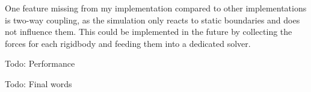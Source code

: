 \documentclass[intern]{cgMA}
\begin{document}
    One feature missing from my implementation compared to other implementations is two-way coupling, as the simulation only reacts to static boundaries and does not influence them. This could be implemented in the future by collecting the forces for each rigidbody and feeding them into a dedicated solver.

    Todo: Performance

    Todo: Final words

    \pagebreak
    \listoffigures
    \pagebreak
    \printbibliography
\end{document}
